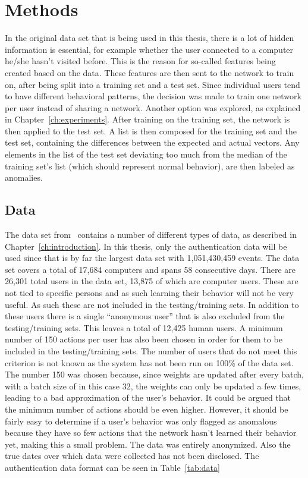 \chapter{Methods}\label{ch:methods}

In the original data set that is being used in this thesis, there is a lot of hidden information is essential, for example whether the user connected to a computer he/she hasn't visited before. This is the reason for so-called features being created based on the data. These features are then sent to the network to train on, after being split into a training set and a test set. Since individual users tend to have different behavioral patterns, the decision was made to train one network per user instead of sharing a network. Another option was explored, as explained in Chapter~\ref{ch:experiments}. After training on the training set, the network is then applied to the test set. A list is then composed for the training set and the test set, containing the differences between the expected and actual vectors. Any elements in the list of the test set deviating too much from the median of the training set's list (which should represent normal behavior), are then labeled as anomalies.

\section{Data}
The data set from~\cite{akent-2015-enterprise-data} contains a number of different types of data, as described in Chapter~\ref{ch:introduction}. In this thesis, only the authentication data will be used since that is by far the largest data set with 1,051,430,459 events. The data set covers a total of 17,684 computers and spans 58 consecutive days. There are 26,301 total users in the data set, 13,875 of which are computer users. These are not tied to specific persons and as such learning their behavior will not be very useful. As such these are not included in the testing/training sets. In addition to these users there is a single \enquote{anonymous user} that is also excluded from the testing/training sets. This leaves a total of 12,425 human users. A minimum number of 150 actions per user has also been chosen in order for them to be included in the testing/training sets. The number of users that do not meet this criterion is not known as the system has not been run on 100\% of the data set. The number 150 was chosen because, since weights are updated after every batch, with a batch size of in this case 32, the weights can only be updated a few times, leading to a bad approximation of the user's behavior. It could be argued that the minimum number of actions should be even higher. However, it should be fairly easy to determine if a user's behavior was only flagged as anomalous because they have so few actions that the network hasn't learned their behavior yet, making this a small problem. The data was entirely anonymized. Also the true dates over which data were collected has not been disclosed. The authentication data format can be seen in Table~\ref{tab:data}

